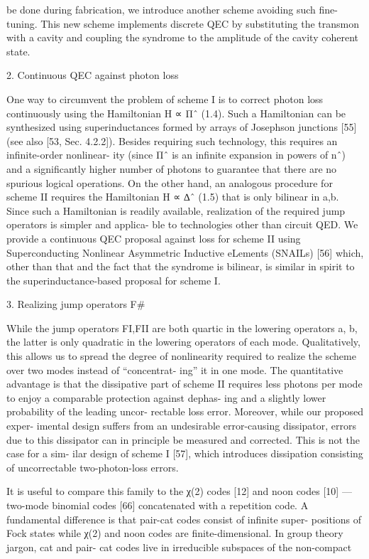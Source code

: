 \documentclass[12]{amsart}
\newcommand\0{\mathbf{0}}
\newcommand\<{\langle}
\renewcommand\>{\rangle}
\begin{document}
be done during fabrication, we introduce another scheme avoiding such fine-tuning. This new scheme implements discrete QEC by substituting the transmon with a cavity and coupling the syndrome to the amplitude of the cavity coherent state.

2. Continuous QEC against photon loss

One way to circumvent the problem of scheme I is to correct photon loss continuously using the Hamiltonian H ∝ Πˆ (1.4). Such a Hamiltonian can be synthesized using superinductances formed by arrays of Josephson junctions [55] (see also [53, Sec. 4.2.2]). Besides requiring such technology, this requires an infinite-order nonlinear- ity (since Πˆ is an infinite expansion in powers of nˆ) and a significantly higher number of photons to guarantee that there are no spurious logical operations. On the other hand, an analogous procedure for scheme II requires the Hamiltonian H ∝ ∆ˆ (1.5) that is only bilinear in a,b. Since such a Hamiltonian is readily available, realization of the required jump operators is simpler and applica- ble to technologies other than circuit QED. We provide a continuous QEC proposal against loss for scheme II using Superconducting Nonlinear Asymmetric Inductive eLements (SNAILs) [56] which, other than that and the fact that the syndrome is bilinear, is similar in spirit to the superinductance-based proposal for scheme I.

3. Realizing jump operators F\#

While the jump operators FI,FII are both quartic in the lowering operators a, b, the latter is only quadratic in the lowering operators of each mode. Qualitatively, this allows us to spread the degree of nonlinearity required to realize the scheme over two modes instead of “concentrat- ing” it in one mode. The quantitative advantage is that the dissipative part of scheme II requires less photons per mode to enjoy a comparable protection against dephas- ing and a slightly lower probability of the leading uncor- rectable loss error. Moreover, while our proposed exper- imental design suffers from an undesirable error-causing dissipator, errors due to this dissipator can in principle be measured and corrected. This is not the case for a sim- ilar design of scheme I [57], which introduces dissipation consisting of uncorrectable two-photon-loss errors.

It is useful to compare this family to the χ(2) codes [12] and noon codes [10] — two-mode binomial codes [66] concatenated with a repetition code. A fundamental difference is that pair-cat codes consist of infinite super- positions of Fock states while χ(2) and noon codes are finite-dimensional. In group theory jargon, cat and pair- cat codes live in irreducible subspaces of the non-compact
\end{document}
